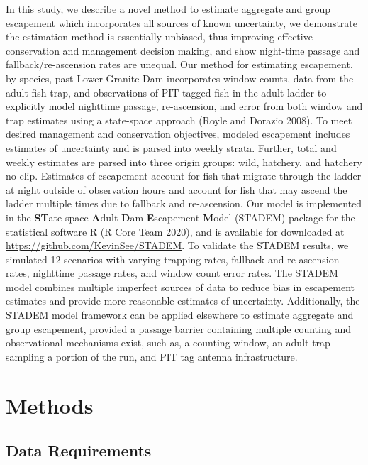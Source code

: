 \documentclass[
  12pt,
]{article}
\begin{document}
In this study, we describe a novel method to estimate aggregate and group escapement which incorporates all sources of known uncertainty, we demonstrate the estimation method is essentially unbiased, thus improving effective conservation and management decision making, and show night-time passage and fallback/re-ascension rates are unequal. Our method for estimating escapement, by species, past Lower Granite Dam incorporates window counts, data from the adult fish trap, and observations of PIT tagged fish in the adult ladder to explicitly model nighttime passage, re-ascension, and error from both window and trap estimates using a state-space approach (Royle and Dorazio 2008). To meet desired management and conservation objectives, modeled escapement includes estimates of uncertainty and is parsed into weekly strata. Further, total and weekly estimates are parsed into three origin groups: wild, hatchery, and hatchery no-clip. Estimates of escapement account for fish that migrate through the ladder at night outside of observation hours and account for fish that may ascend the ladder multiple times due to fallback and re-ascension. Our model is implemented in the \textbf{ST}ate-space \textbf{A}dult \textbf{D}am \textbf{E}scapement \textbf{M}odel (STADEM) package for the statistical software R (R Core Team 2020), and is available for downloaded at \url{https://github.com/KevinSee/STADEM}. To validate the STADEM results, we simulated 12 scenarios with varying trapping rates, fallback and re-ascension rates, nighttime passage rates, and window count error rates. The STADEM model combines multiple imperfect sources of data to reduce bias in escapement estimates and provide more reasonable estimates of uncertainty. Additionally, the STADEM model framework can be applied elsewhere to estimate aggregate and group escapement, provided a passage barrier containing multiple counting and observational mechanisms exist, such as, a counting window, an adult trap sampling a portion of the run, and PIT tag antenna infrastructure.

\hypertarget{methods}{%
\section{Methods}\label{methods}}

\hypertarget{data-requirements}{%
\subsection{Data Requirements}\label{data-requirements}}
\end{document}
